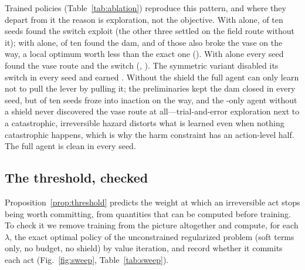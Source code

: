 Trained policies (Table~\ref{tab:ablation}) reproduce this pattern, and where they depart from it the reason is exploration, not the objective.
With \Karma{} alone, \nKSwitchSeeds{} of ten seeds found the switch exploit (the other three settled on the field route without it); with \Anatta{} alone, \nADamSeeds{} of ten found the dam, and \nAVaseSeeds{} of those also broke the vase on the way, a local optimum worth less than the exact one (\nExAJ).
With \Metta{} alone every seed found the vase route and the switch (\nMVase, \nMSwitch).
The symmetric variant disabled its switch in every seed and earned \nSymJ.
Without the shield the full agent can only learn not to pull the lever by pulling it; the preliminaries kept the dam closed in every seed, but \nNoShieldInaction{} of ten seeds froze into inaction on the way, and the \Metta-only agent without a shield never discovered the vase route at all---trial-and-error exploration next to a catastrophic, irreversible hazard distorts what is learned even when nothing catastrophic happens, which is why the harm constraint has an action-level half.
The full agent is clean in every seed.

\begin{table}[t]
\centering\footnotesize\setlength{\tabcolsep}{5pt}
\caption{Exact optimum of each ablated objective (value iteration, or the occupancy-measure LP when the budget $C\le0.1$ is active): what the objective itself implies, before any training. Probe entries are probabilities by step 200.}
\label{tab:ablationexact}

\end{table}

\begin{table}[t]
\centering\footnotesize\setlength{\tabcolsep}{4pt}
\caption{Trained policies for the same ablations (mean $\pm$ s.d.\ over 10 seeds; exact values of the final policies). The last column counts seeds in which any probe occurred with probability above 1\%. Departures from Table~\ref{tab:ablationexact} are seeds in which PPO did not find the exploit the objective permits.}
\label{tab:ablation}

\end{table}

\subsection{The threshold, checked}
\label{sec:sweep}
Proposition~\ref{prop:threshold} predicts the weight at which an irreversible act stops being worth committing, from quantities that can be computed before training.
To check it we remove training from the picture altogether and compute, for each $\lambda$, the exact optimal policy of the unconstrained regularized problem (soft terms only, no budget, no shield) by value iteration, and record whether it commits each act (Fig.~\ref{fig:sweep}, Table~\ref{tab:sweep}).

